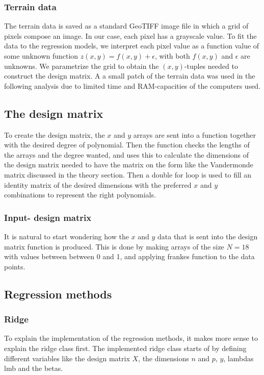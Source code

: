 \documentclass[../main.tex]{subfiles}
\begin{document}
\subsubsection{Terrain data}
The terrain data is saved as a standard GeoTIFF image file in which a grid of pixels compose an image. In our case, each pixel has a grayscale value. To fit the data to the regression models, we interpret each pixel value as a function value of some unknown function \ensuremath{z(x,y)=f(x,y)+\epsilon}, with both \ensuremath{f(x,y)} and $\epsilon$ are unknowns. We parametrize the grid to obtain the \ensuremath{(x,y)}-tuples needed to construct the design matrix. A a small patch of the terrain data was used in the following analysis due to limited time and RAM-capacities of the computers used.

\subsection{The design matrix}
To create the design matrix, the $x$ and $y$ arrays are sent into a function together with the desired degree of polynomial. Then the function checks the lengths of the arrays and the degree wanted, and uses this to calculate the dimensions of the design matrix needed to have the matrix on the form like the Vandermonde matrix discussed in the theory section. Then a double for loop is used to fill an identity matrix of the desired dimensions with the preferred $x$ and $y$ combinations to represent the right polynomials.

\subsubsection{Input- design matrix}
It is natural to start wondering how the $x$ and $y$ data that is sent into the design matrix function is produced. This is done by making arrays of the size $N=18$ with values between between 0 and 1, and applying frankes function to the data points.

\subsection{Regression methods}
\subsubsection{Ridge}
To explain the implementation of the regression methods, it makes more sense to explain the ridge class first. The implemented ridge class starts of by defining different variables like the design matrix $X$, the dimensions $n$ and $p$, $y$, lambdas lmb and the betas.
\end{document}
